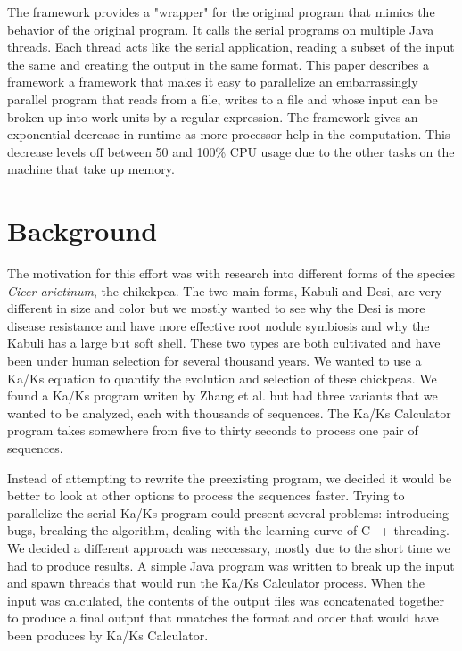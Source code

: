 \documentclass[12pt]{article}
\begin{document}
The framework provides a "wrapper" for the original program that mimics the
behavior of the original program. It calls the serial programs on multiple Java 
threads. Each thread acts like the serial application, reading a subset of the 
input the same and creating the output in the same format. This paper describes
a framework a framework that makes it easy to parallelize an embarrassingly
parallel program that reads from a file, writes to a file and whose input can be
broken up into work units by a regular expression. The framework gives an
exponential decrease in runtime as more processor help in the computation. This
decrease levels off between 50 and 100\% CPU usage due to the other tasks on the
machine that take up memory.

\section{Background}

The motivation for this effort was with research into different forms of the 
species \emph{Cicer arietinum}, the chikckpea. The two main forms, Kabuli and 
Desi, are very different in size and color but we mostly wanted to see why the 
Desi is more disease resistance and have more effective root nodule symbiosis 
and why the Kabuli has a large but soft shell. These two types are both 
cultivated and have been under human selection for several thousand years. We 
wanted to use a Ka/Ks equation to quantify the evolution and selection of these 
chickpeas. We found a Ka/Ks program writen by Zhang et al. \cite{kaks} but had 
three variants that we wanted to be analyzed, each with thousands of sequences. 
The Ka/Ks Calculator program takes somewhere from five to thirty seconds to 
process one pair of sequences. 

Instead of attempting to rewrite the preexisting program, we decided it would be
better to look at other options to process the sequences faster. Trying to 
parallelize the serial Ka/Ks program could present several problems: introducing
bugs, breaking the algorithm, dealing with the learning curve of C++ threading. 
We decided a  different approach was neccessary, mostly due to the short time we
had to produce results. A simple Java program was written to break up the input 
and spawn  threads that would run the Ka/Ks Calculator process. When the input 
was calculated, the contents of the output files was concatenated together to 
produce a final output that mnatches the format and order that would have been
produces by Ka/Ks Calculator.
\end{document}
